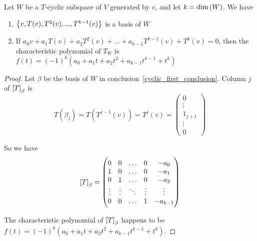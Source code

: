 \begin{theorem}\label{char_poly_of_invariant_subspace}
    Let $W$ be a $T$-cyclic subspace of $V$ generated by $v$, and let $k = \displaystyle \text{dim}\left( W \right)$. We have
    \begin{enumerate}
        \item $\set{v, T(v), T^2(v), ..., T^{k-1}(v)}$ is a basis of $W$\label{cyclic_first_conclusion}
        \item If $a_0 v + a_1 T(v) + a_2 T^2(v) + ... + a_{k-1} T^{k-1} (v) + T^k (v) = 0$, then the characteristic polynomial of $T_W$ is $f(t) = (-1)^k (a_0 + a_1 t + a_2 t^2 + a_{k-1} t^{k-1} + t^k)$
    \end{enumerate}
\end{theorem}
\begin{proof}
    Let $\beta$ be the basis of $W$ in conclusion~\ref{cyclic_first_conclusion}. Column $j$ of $\coordinate{T}_\beta$ is 
    \begin{equation*}
        T(\beta_j) = T\left(T^{j-1}(v)\right) = T^{j}(v) = \begin{pmatrix}
            0 \\
            \vdots \\
            1_{j+1} \\
            \vdots \\
            0
        \end{pmatrix}
    \end{equation*}
    
    So we have 
    \begin{equation*}
        \coordinate{T}_\beta = \begin{pmatrix}
            0 & 0 & \hdots & 0 & -a_0 \\
            1 & 0 & \hdots & 0 & -a_1 \\
            0 & 1 & \hdots & 0 & -a_2 \\
            \vdots & \vdots & \ddots & \vdots & \vdots \\
            0 & 0 & \hdots & 1 & -a_{k-1}
        \end{pmatrix}
    \end{equation*}
    
    The characteristic polynomial of $\coordinate{T}_\beta$ happens to be $f(t) = (-1)^k (a_0 + a_1 t + a_2 t^2 + a_{k-1} t^{k-1} + t^k)$.
\end{proof}

